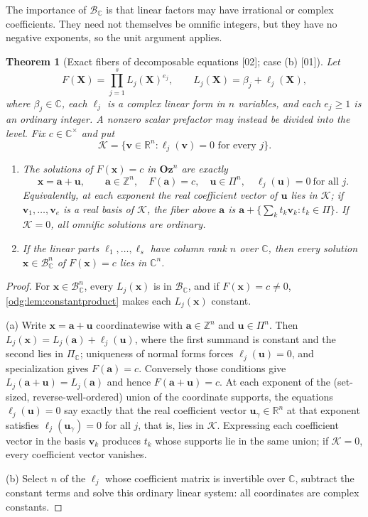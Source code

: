 \documentclass[11pt,oneside]{article}
\numberwithin{equation}{section}
\newtheorem{theorem}{Theorem}[section]
\theoremstyle{definition}
\theoremstyle{remark}
\newcommand{\Oz}{\mathbf{Oz}}
\newcommand{\Z}{\mathbb Z}
\newcommand{\R}{\mathbb R}
\newcommand{\C}{\mathbb C}
\newcommand{\BC}{\mathcal B_{\C}}
\newcommand{\src}[1]{\textup{\textsf{\small[#1]}}}
\begin{document}
The importance of $\BC$ is that linear factors may have irrational or
complex coefficients. They need not themselves be omnific integers, but they
have no negative exponents, so the unit argument applies.

\begin{theorem}[Exact fibers of decomposable equations \src{02}; case (b) \src{01}]\label{odg:thm:decomposable}
Let
\[
 F(\mathbf X)=\prod_{j=1}^{s}L_j(\mathbf X)^{e_j},\qquad
 L_j(\mathbf X)=\beta_j+\ell_j(\mathbf X),
\]
where $\beta_j\in\C$, each $\ell_j$ is a complex linear form in
$n$ variables, and each $e_j\ge1$ is an ordinary integer. A nonzero scalar
prefactor may instead be divided into the level. Fix $c\in\C^\times$ and put
\[
 \mathcal K=\{\mathbf v\in\R^n:\ell_j(\mathbf v)=0\text{ for every }j\}.
\]
\begin{enumerate}[label=\textup{(\alph*)},leftmargin=*]
\item The solutions of $F(\mathbf x)=c$ in $\Oz^n$ are exactly
\begin{equation}\label{odg:eq:decomposablefiber}
 \mathbf x=\mathbf a+\mathbf u,\qquad \mathbf a\in\Z^n,
 \quad F(\mathbf a)=c,
 \quad \mathbf u\in\Pi^n,
 \quad \ell_j(\mathbf u)=0\ \text{for all }j.
\end{equation}
Equivalently, at each exponent the real coefficient vector of $\mathbf u$
lies in $\mathcal K$; if $\mathbf v_1,\ldots,\mathbf v_e$ is a real basis of
$\mathcal K$, the fiber above $\mathbf a$ is
$\mathbf a+\{\sum_k t_k\mathbf v_k:t_k\in\Pi\}$. If $\mathcal K=0$, all
omnific solutions are ordinary.
\item If the linear parts $\ell_1,\ldots,\ell_s$ have column rank $n$ over
$\C$, then every solution $\mathbf x\in\BC^n$ of $F(\mathbf x)=c$ lies in
$\C^n$.
\end{enumerate}
\end{theorem}
\begin{proof}
For $\mathbf x\in\BC^n$, every $L_j(\mathbf x)$ is in $\BC$, and if
$F(\mathbf x)=c\ne0$, \cref{odg:lem:constantproduct} makes each
$L_j(\mathbf x)$ constant.

(a) Write $\mathbf x=\mathbf a+\mathbf u$ coordinatewise with
$\mathbf a\in\Z^n$ and $\mathbf u\in\Pi^n$. Then
$L_j(\mathbf x)=L_j(\mathbf a)+\ell_j(\mathbf u)$, where the first summand is
constant and the second lies in $\Pi_{\C}$; uniqueness of normal forms
forces $\ell_j(\mathbf u)=0$, and specialization gives $F(\mathbf a)=c$.
Conversely those conditions give $L_j(\mathbf a+\mathbf u)=L_j(\mathbf a)$ and
hence $F(\mathbf a+\mathbf u)=c$. At each exponent of the (set-sized,
reverse-well-ordered) union of the coordinate supports, the equations
$\ell_j(\mathbf u)=0$ say exactly that the real coefficient vector
$\mathbf u_\gamma\in\R^n$ at that exponent satisfies $\ell_j(\mathbf u_\gamma)=0$
for all $j$, that is, lies in $\mathcal K$. Expressing each coefficient vector in the basis
$\mathbf v_k$ produces $t_k$ whose supports lie in the same union; if
$\mathcal K=0$, every coefficient vector vanishes.

(b) Select $n$ of the $\ell_j$ whose coefficient matrix is invertible over
$\C$, subtract the constant terms and solve this ordinary linear system:
all coordinates are complex constants.
\end{proof}
\end{document}
